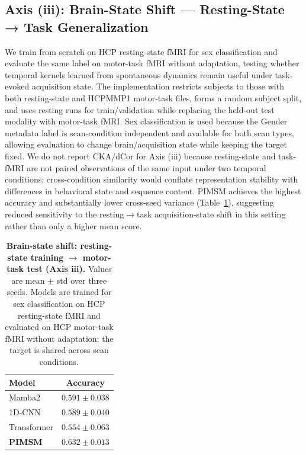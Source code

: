 \documentclass{article}
\begin{document}
\subsection{Axis (iii): Brain-State Shift --- Resting-State → Task Generalization}
\label{sec:results:brainstateshift}

We train from scratch on HCP resting-state fMRI for sex classification and evaluate the same label on motor-task fMRI without adaptation, testing whether temporal kernels learned from spontaneous dynamics remain useful under task-evoked acquisition state.
The implementation restricts subjects to those with both resting-state and HCPMMP1 motor-task files, forms a random subject split, and uses resting runs for train/validation while replacing the held-out test modality with motor-task fMRI.
Sex classification is used because the Gender metadata label is scan-condition independent and available for both scan types, allowing evaluation to change brain/acquisition state while keeping the target fixed.
We do not report CKA/dCor for Axis (iii) because resting-state and task-fMRI are not paired observations of the same input under two temporal conditions; cross-condition similarity would conflate representation stability with differences in behavioral state and sequence content.
PIMSM achieves the highest accuracy and substantially lower cross-seed variance (Table~\ref{tab:brainstateshift}), suggesting reduced sensitivity to the resting$\to$task acquisition-state shift in this setting rather than only a higher mean score.

\begin{table}[htbp]
\centering
\footnotesize
\begin{tabular}{lc}
\toprule
Model & Accuracy \\
\midrule
Mamba2      & $0.591\pm0.038$ \\
1D-CNN      & $0.589\pm0.040$ \\
Transformer & $0.554\pm0.063$ \\
\midrule
\textbf{PIMSM} & $\mathbf{0.632\pm0.013}$ \\
\bottomrule
\end{tabular}
\caption{
\textbf{Brain-state shift: resting-state training $\to$ motor-task test (Axis iii).}
Values are mean $\pm$ std over three seeds. Models are trained for sex classification on HCP resting-state fMRI and evaluated on HCP motor-task fMRI without adaptation; the target is shared across scan conditions.
}
\label{tab:brainstateshift}
\end{table}
\end{document}
